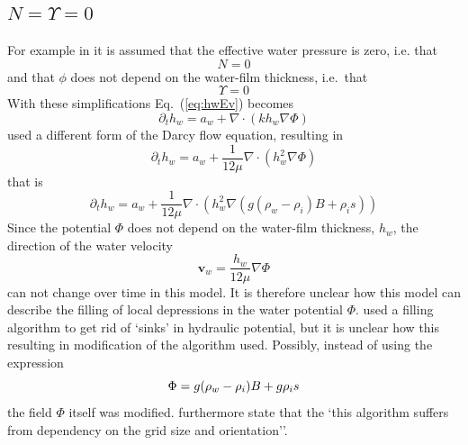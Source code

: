 \documentclass[10pt,a4paper]{article}
\begin{document}
\subsection{$N=\Upsilon=0$}
For example in \cite{LeBrocq2009} it is assumed
that the effective water pressure is zero, i.e. that
\[
N=0
\]
and that $\phi$ does not depend on the water-film thickness, i.e.\ that
\[
\Upsilon=0
\]
With these simplifications Eq.~(\ref{eq:hwEv}) becomes
\begin{equation}
\partial_t h_w  = a_w + \nabla \cdot (k h_w \nabla \Phi )
\label{eq:hwEvALB}
\end{equation}
\cite{LeBrocq2009} used a different form of the Darcy flow equation, resulting in
\begin{equation}
\partial_t h_w  = a_w + \frac{1}{12 \mu} \nabla \cdot (h_w^2 \nabla \Phi) 
\label{eq:hwEvALB}
\end{equation}
that is
\begin{equation}
\partial_t h_w  = a_w + \frac{1}{12 \mu} \nabla \cdot (h_w^2 \nabla (g (\rho_w-\rho_i)B + \rho_i s))
\label{eq:hwEvALB2}
\end{equation}
Since the potential $\Phi$ does not depend on the water-film
thickness, $h_w$, the direction of the water velocity
\[
\bm{v}_w = \frac{h_w}{12 \mu} \nabla \Phi
\]
can not change over time in this model. It is therefore unclear how
this model can describe the filling of local depressions in the water
potential $\Phi$.
\]
\cite{LeBrocq2009} used a filling algorithm to get rid of `sinks' in
hydraulic potential, but it is unclear how this resulting in
modification of the algorithm used. Possibly, instead of using the expression 
\[
  \Phi= g (\rho_w -\rho_i) B + g \rho_i s \\
\]
the field $\Phi$ itself was modified. \cite{LeBrocq2009} furthermore
state that the `this algorithm suffers from dependency on the grid
size and orientation''.
\end{document}

